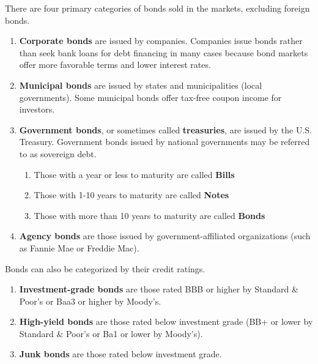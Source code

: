 \documentclass{article}
\begin{document}
    \begin{definition} 
      There are four primary categories of bonds sold in the markets, excluding foreign bonds. 
      \begin{enumerate}
        \item \textbf{Corporate bonds} are issued by companies. Companies issue bonds rather than seek bank loans for debt financing in many cases because bond markets offer more favorable terms and lower interest rates.
        \item \textbf{Municipal bonds} are issued by states and municipalities (local governments). Some municipal bonds offer tax-free coupon income for investors. 
        \item \textbf{Government bonds}, or sometimes called \textbf{treasuries}, are issued by the U.S. Treasury. Government bonds issued by national governments may be referred to as sovereign debt. 
        \begin{enumerate}
            \item Those with a year or less to maturity are called \textbf{Bills}
            \item Those with 1-10 years to maturity are called \textbf{Notes}
            \item Those with more than 10 years to maturity are called \textbf{Bonds}
        \end{enumerate}
        \item \textbf{Agency bonds} are those issued by government-affiliated organizations (such as Fannie Mae or Freddie Mac). 
      \end{enumerate}
    \end{definition}

    \begin{definition}
      Bonds can also be categorized by their credit ratings. 
      \begin{enumerate}
        \item \textbf{Investment-grade bonds} are those rated BBB or higher by Standard \& Poor's or Baa3 or higher by Moody's. 
        \item \textbf{High-yield bonds} are those rated below investment grade (BB+ or lower by Standard \& Poor's or Ba1 or lower by Moody's). 
        \item \textbf{Junk bonds} are those rated below investment grade. 
      \end{enumerate}
    \end{definition}
\end{document}
